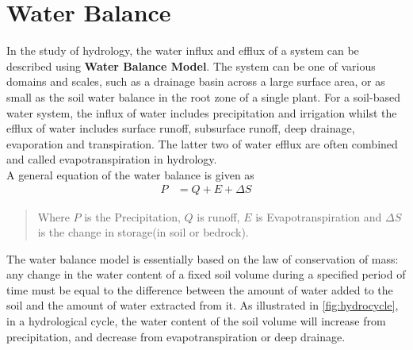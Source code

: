 
\chapter{Water Balance} %

\label{ch:WaterBalance} %

In the study of hydrology, the water influx and efflux of a system can be described using \textbf{Water Balance Model}. The system can be one of various domains and scales, such as a drainage basin across a large surface area\citep{Kirby2008}, or as small as the soil water balance in the root zone of a single plant\citep{Zhang2002}. For a soil-based water system, the influx of water includes precipitation and irrigation whilst the efflux of water includes surface runoff, subsurface runoff, deep drainage, evaporation and transpiration. The latter two of water efflux are often combined and called evapotranspiration in hydrology.\\
\newline
A general equation of the water balance is given as
\begin{align}
P&=Q+E+\Delta S\label{eq:generalwaterbalance}
\end{align}
\begin{quote}Where $P$ is the Precipitation, $Q$ is runoff, $E$ is Evapotranspiration and $\Delta S$ is the change in storage(in soil or bedrock).
\end{quote}
The water balance model is essentially based on the law of conservation of mass: any change in the water content of a fixed soil volume during a specified period of time must be equal to the difference between the amount of water added to the soil and the amount of water extracted from it. As illustrated in \autoref{fig:hydrocycle}, in a hydrological cycle, the water content of the soil volume will increase from precipitation, and decrease from evapotranspiration or deep drainage.
